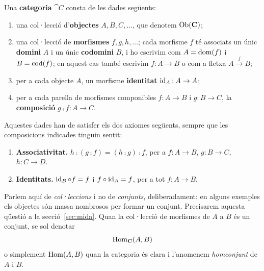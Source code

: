 \begin{definicio}
\label{def:categoria}
Una \textbf{categoria} $\cat{C}$ consta de les dades següents:
\begin{enumerate}
\item una col·lecció d'\textbf{objectes} $A,B,C,\dots$, que denotem $\operatorname{Ob}(\mathbf{C})$;
\item una col·lecció de \textbf{morfismes} $f,g,h,\dots$; cada morfisme $f$ té associats un únic \textbf{domini} $A$ i un únic \textbf{codomini} $B$, i ho escrivim com $A=\operatorname{dom}(f)$ i $B=\operatorname{cod}(f)$; en aquest cas també escrivim $f\colon A\to B$ o com a fletxa $A\xrightarrow{f}B$;
\item per a cada objecte $A$, un morfisme \textbf{identitat} $\operatorname{id}_A\colon A\to A$;
\item per a cada parella de morfismes componibles $f\colon A\to B$ i $g\colon B\to C$, la \textbf{composició} $g\comp f\colon A\to C$.
\end{enumerate}
Aquestes dades han de satisfer els dos axiomes següents, sempre que les composicions indicades tinguin sentit:
\begin{enumerate}
\item \textbf{Associativitat.} $h\comp(g\comp f)=(h\comp g)\comp f$, per a $f\colon A\to B$, $g\colon B\to C$, $h\colon C\to D$.
\item \textbf{Identitats.} $\operatorname{id}_B\circ f=f$ i $f\circ\operatorname{id}_A=f$, per a tot $f\colon A\to B$.
\end{enumerate}
\end{definicio}

Parlem aquí de \emph{col·leccions} i no de \emph{conjunts}, deliberadament: en alguns exemples els objectes són massa nombrosos per formar un conjunt. Precisarem aquesta qüestió a la secció~\ref{sec:mida}. Quan la col·lecció de morfismes de $A$ a $B$ és un conjunt, se sol denotar
\[
\operatorname{Hom}_{\mathbf{C}}(A,B)
\]
o simplement $\operatorname{Hom}(A,B)$ quan la categoria és clara i l'anomenem \emph{homconjunt} de $A$ i $B$.

